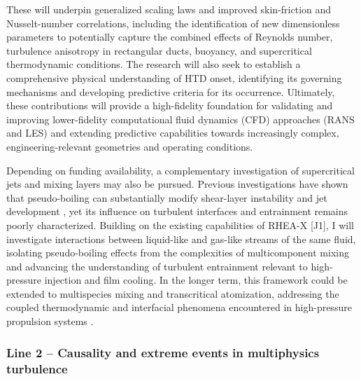 \documentclass[11pt]{article}
\begin{document}
These will underpin generalized scaling laws and improved skin-friction and Nusselt-number correlations, including the identification of new dimensionless parameters to potentially capture the combined effects of Reynolds number, turbulence anisotropy in rectangular ducts, buoyancy, and supercritical thermodynamic conditions.
The research will also seek to establish a comprehensive physical understanding of HTD onset, identifying its governing mechanisms and developing predictive criteria for its occurrence.
Ultimately, these contributions will provide a high-fidelity foundation for validating and improving lower-fidelity computational fluid dynamics (CFD) approaches (RANS and LES) and extending predictive capabilities towards increasingly complex, engineering-relevant geometries and operating conditions.

Depending on funding availability, a complementary investigation of supercritical jets and mixing layers may also be pursued.
Previous investigations have shown that pseudo-boiling can substantially modify shear-layer instability and jet development \cite{Lapenna2019,SharanBellan2021}, yet its influence on turbulent interfaces and entrainment remains poorly characterized.
Building on the existing capabilities of RHEA-X [J1], I will investigate interactions between liquid-like and gas-like streams of the same fluid, isolating pseudo-boiling effects from the complexities of multicomponent mixing and advancing the understanding of turbulent entrainment relevant to high-pressure injection and film cooling.
In the longer term, this framework could be extended to multispecies mixing and transcritical atomization, addressing the coupled thermodynamic and interfacial phenomena encountered in high-pressure propulsion systems \cite{JofreUrzay2021}.

\subsubsection{Line 2 -- Causality and extreme events in multiphysics turbulence}
\end{document}
